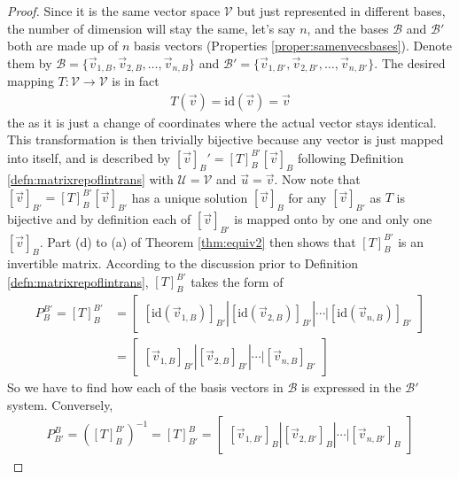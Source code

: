 \begin{proof}
Since it is the same vector space $\mathcal{V}$ but just represented in different bases, the number of dimension will stay the same, let's say $n$, and the bases $\mathcal{B}$ and $\mathcal{B}'$ both are made up of $n$ basis vectors (Properties \ref{proper:samenvecsbases}). Denote them by $\mathcal{B} = \{\vec{v}_{1,B}, \vec{v}_{2,B}, \ldots, \vec{v}_{n,B}\}$ and $\mathcal{B'} = \{\vec{v}_{1,B'}, \vec{v}_{2,B'}, \ldots, \vec{v}_{n,B'}\}$. The desired mapping $T: \mathcal{V} \to \mathcal{V}$ is in fact
\begin{align*}
T(\vec{v}) = \text{id}(\vec{v}) = \vec{v}
\end{align*}
the  as it is just a change of coordinates where the actual vector stays identical. This transformation is then trivially bijective because any vector is just mapped into itself, and is described by $[\vec{v}]_B' = [T]_B^{B'} [\vec{v}]_B$ following Definition \ref{defn:matrixrepoflintrans} with $\mathcal{U} = \mathcal{V}$ and $\vec{u} = \vec{v}$. Now note that $[\vec{v}]_{B'} = [T]_B^{B'} [\vec{v}]_{B'}$ has a unique solution $[\vec{v}]_B$ for any $[\vec{v}]_{B'}$ as $T$ is bijective and by definition each of $[\vec{v}]_{B'}$ is mapped onto by one and only one $[\vec{v}]_B$. Part (d) to (a) of Theorem \ref{thm:equiv2} then shows that $[T]_B^{B'}$ is an invertible matrix. According to the discussion prior to Definition \ref{defn:matrixrepoflintrans}, $[T]_B^{B'}$ takes the form of
\begin{align*}
P_B^{B'} = [T]_B^{B'} &= \begin{bmatrix}
[\text{id}(\vec{v}_{1,B})]_{B'} | [\text{id}(\vec{v}_{2,B})]_{B'} | \cdots | [\text{id}(\vec{v}_{n,B})]_{B'}
\end{bmatrix} \\
&=
\begin{bmatrix}
[\vec{v}_{1,B}]_{B'} | [\vec{v}_{2,B}]_{B'} | \cdots | [\vec{v}_{n,B}]_{B'}
\end{bmatrix}
\end{align*}
So we have to find how each of the basis vectors in $\mathcal{B}$ is expressed in the $\mathcal{B}'$ system. Conversely,
\begin{align*}
P_{B'}^B = ([T]_B^{B'})^{-1} = [T]_{B'}^B =
\begin{bmatrix}
[\vec{v}_{1,B'}]_B | [\vec{v}_{2,B'}]_B | \cdots | [\vec{v}_{n,B'}]_B
\end{bmatrix}
\end{align*}

\end{proof}

